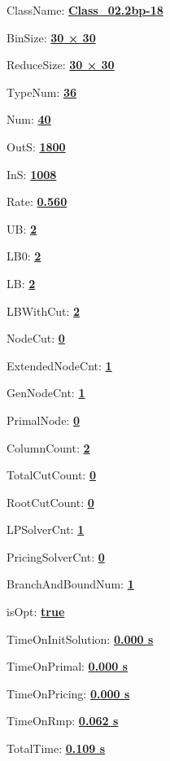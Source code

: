 \documentclass[11pt]{article}
\begin{document}
\pagestyle{empty}


ClassName: \underline{\textbf{Class_02.2bp-18}}
\par
BinSize: \underline{\textbf{30 × 30}}
\par
ReduceSize: \underline{\textbf{30 × 30}}
\par
TypeNum: \underline{\textbf{36}}
\par
Num: \underline{\textbf{40}}
\par
OutS: \underline{\textbf{1800}}
\par
InS: \underline{\textbf{1008}}
\par
Rate: \underline{\textbf{0.560}}
\par
UB: \underline{\textbf{2}}
\par
LB0: \underline{\textbf{2}}
\par
LB: \underline{\textbf{2}}
\par
LBWithCut: \underline{\textbf{2}}
\par
NodeCut: \underline{\textbf{0}}
\par
ExtendedNodeCnt: \underline{\textbf{1}}
\par
GenNodeCnt: \underline{\textbf{1}}
\par
PrimalNode: \underline{\textbf{0}}
\par
ColumnCount: \underline{\textbf{2}}
\par
TotalCutCount: \underline{\textbf{0}}
\par
RootCutCount: \underline{\textbf{0}}
\par
LPSolverCnt: \underline{\textbf{1}}
\par
PricingSolverCnt: \underline{\textbf{0}}
\par
BranchAndBoundNum: \underline{\textbf{1}}
\par
isOpt: \underline{\textbf{true}}
\par
TimeOnInitSolution: \underline{\textbf{0.000 s}}
\par
TimeOnPrimal: \underline{\textbf{0.000 s}}
\par
TimeOnPricing: \underline{\textbf{0.000 s}}
\par
TimeOnRmp: \underline{\textbf{0.062 s}}
\par
TotalTime: \underline{\textbf{0.109 s}}
\par
\newpage
\end{document}
